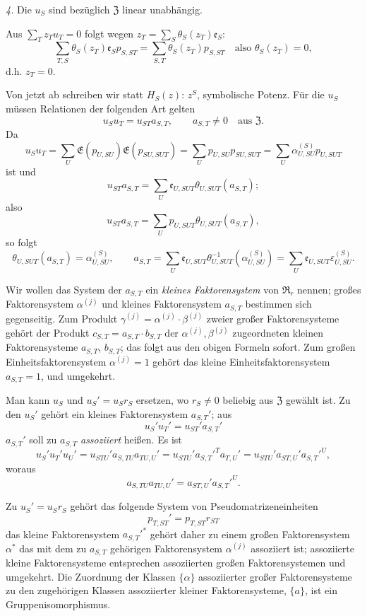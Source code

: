 \documentclass[12pt,a4paper]{article}
\theoremstyle{plain}
\theoremstyle{definition}
\theoremstyle{remark}
\begin{document}
\textit{4.} Die $u_{S}$ sind bez\"uglich $\mathfrak{Z}$ linear unabh\"angig.

Aus $\sum_{T}z_{T}u_{T} = 0$ folgt wegen $z_{T} = \sum_{S}\theta_{S}(z_{T})\mathfrak{e}_{S}$:
\[
\sum_{T,S}\theta_{S}(z_{T})\mathfrak{e}_{S}p_{S,ST} = \sum_{S,T}\theta_{S}(z_{T})p_{S,ST}
\quad \text{also } \theta_{S}(z_{T}) = 0,
\]
d.h. $z_{T} = 0$.

Von jetzt ab schreiben wir statt $H_{S}(z)$: $z^{S}$, \glqq symbolische
Potenz\grqq. F\"ur die $u_{S}$ m\"ussen Relationen der folgenden Art gelten
\[
u_{S}u_{T} = u_{ST}a_{S,T}, \qquad a_{S,T} \neq 0 \quad \text{aus } \mathfrak{Z}.
\]
Da
\[
u_{S}u_{T} = \sum_{U}\mathfrak{E}(p_{U,SU})\mathfrak{E}(p_{SU,SUT})
= \sum_{U}p_{U,SU}p_{SU,SUT}
= \sum_{U}\alpha_{U,SU}^{(S)}p_{U,SUT}
\]
ist und
\[
u_{ST}a_{S,T} = \sum_{U}\mathfrak{e}_{U,SUT}\theta_{U,SUT}(a_{S,T});
\]
also
\[
u_{ST}a_{S,T} = \sum_{U}p_{U,SUT}\theta_{U,SUT}(a_{S,T}),
\]
so folgt
\[
\theta_{U,SUT}(a_{S,T}) = \alpha_{U,SU}^{(S)}, \qquad
a_{S,T} = \sum_{U}\mathfrak{e}_{U,SUT}\theta_{U,SUT}^{-1}(\alpha_{U,SU}^{(S)})
= \sum_{U}\mathfrak{e}_{U,SUT}\varepsilon_{U,SU}^{(S)}.
\]

Wir wollen das System der $a_{S,T}$ ein \textit{kleines Faktorensystem} von
$\mathfrak{R}_{r}$ nennen; gro\ss es Faktorensystem $\alpha^{(j)}$ und kleines Faktorensystem
$a_{S,T}$ bestimmen sich gegenseitig. Zum Produkt $\gamma^{(j)} = \alpha^{(j)} \cdot \beta^{(j)}$
zweier gro\ss er Faktorensysteme geh\"ort der Produkt $c_{S,T} = a_{S,T} \cdot b_{S,T}$
der $\alpha^{(j)}, \beta^{(j)}$ zugeordneten kleinen Faktorensysteme $a_{S,T}$, $b_{S,T}$;
das folgt aus den obigen Formeln sofort. Zum gro\ss en Einheitsfaktorensystem
$\alpha^{(j)} = 1$ geh\"ort das kleine Einheitsfaktorensystem $a_{S,T} = 1$, und
umgekehrt.

Man kann $u_{S}$ und $u_{S}' = u_{S}r_{S}$ ersetzen, wo $r_{S} \neq 0$ beliebig aus
$\mathfrak{Z}$ gew\"ahlt ist. Zu den $u_{S}'$ geh\"ort ein kleines Faktorensystem
$a_{S,T}'$; aus
\begin{equation}\label{eq:25-1}
u_{S}'u_{T}' = u_{ST}'a_{S,T}'
\end{equation}
$a_{S,T}'$ soll zu $a_{S,T}$ \textit{assoziiert} hei\ss en. Es ist
\[
u_{S}'u_{T}'u_{U}' = u_{STU}'a_{S,TU}a_{TU,U}' = u_{STU}'a_{S,T}'^{T}a_{T,U}'
= u_{STU}'a_{ST,U}'a_{S,T}'^{U},
\]
woraus
\begin{equation}\label{eq:25-2}
a_{S,TU}a_{TU,U}' = a_{ST,U}'a_{S,T}'^{U}.
\end{equation}

Zu $u_{S}' = u_{S}r_{S}$ geh\"ort das folgende System von Pseudomatrizeneinheiten
\[
p_{T,ST}' = p_{T,ST}r_{ST}
\]
das kleine Faktorensystem $a_{S,T}'^{*}$ geh\"ort daher zu einem gro\ss en
Faktorensystem $\alpha^{*}$ das mit dem zu $a_{S,T}$ geh\"origen Faktorensystem
$\alpha^{(j)}$ assoziiert ist; assoziierte kleine Faktorensysteme entsprechen
assoziierten gro\ss en Faktorensystemen und umgekehrt. Die Zuordnung der
Klassen $\{\alpha\}$ assoziierter gro\ss er Faktorensysteme zu den zugeh\"origen
Klassen assoziierter kleiner Faktorensysteme, $\{a\}$, ist ein
Gruppenisomorphismus.
\end{document}
